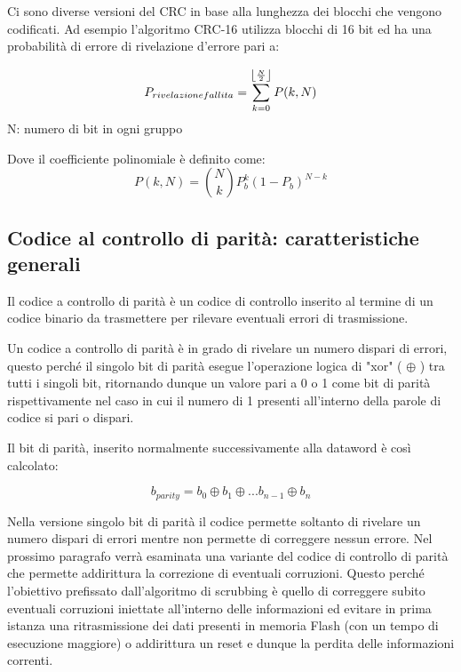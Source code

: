\documentclass[LaM,binding=0.6cm]{../sapthesis}
\DeclarePairedDelimiter\floor{\lfloor}{\rfloor}
\begin{document}
Ci sono diverse versioni del CRC in base alla lunghezza dei blocchi che vengono codificati. Ad esempio l'algoritmo CRC-16 utilizza blocchi di 16 bit ed ha una probabilità di errore di rivelazione d'errore pari a:

\begin{equation}
    P_{rivelazione fallita} = \sum_{k=0}^{\floor*{\frac{N}{2}}} P(k,N)
\end{equation}
    N: numero di bit in ogni gruppo

Dove il coefficiente polinomiale è definito come:
\begin{equation}
    P(k,N) =  \binom{N}{k} P_{b}^{k} (1-P_{b})^{N-k}
\end{equation}    
\subsection{Codice al controllo di parità: caratteristiche generali}

Il codice  a  controllo  di  parità  è un codice di controllo inserito al termine di un codice binario da trasmettere per rilevare eventuali errori di trasmissione.

Un  codice  a  controllo  di  parità  è  in  grado  di  rivelare  un
numero dispari di errori, questo perché il singolo bit di parità esegue l'operazione logica di "xor" ( $\oplus{}$ ) tra tutti i singoli bit, ritornando dunque un valore pari a 0 o 1 come bit di parità rispettivamente nel caso in cui il numero di 1 presenti all'interno della parole di codice si pari o dispari.

Il bit di parità, inserito normalmente successivamente alla dataword è così calcolato:

\begin{equation}
    b_{parity} =b_{0} \oplus{}  b_{1} \oplus{}  ...b_{n-1} \oplus{} b_{n} 
\end{equation}

Nella versione singolo bit di parità il codice permette soltanto di rivelare un numero dispari di errori mentre non permette di correggere nessun errore.
\newline
Nel prossimo paragrafo verrà esaminata una variante del codice di controllo di parità che permette addirittura la correzione di eventuali corruzioni. Questo perché l'obiettivo prefissato dall'algoritmo di scrubbing è quello di correggere subito eventuali corruzioni iniettate all'interno delle informazioni ed evitare in prima istanza una ritrasmissione dei dati presenti in memoria Flash (con un tempo di esecuzione maggiore) o addirittura un reset e dunque la perdita delle informazioni correnti.
\end{document}
